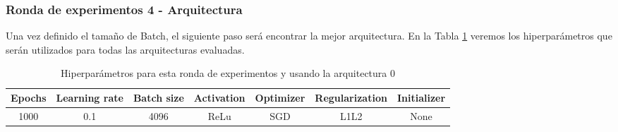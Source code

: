 \documentclass{article}
\begin{document}
      \subsubsection{Ronda de experimentos 4 - Arquitectura}
		\label{j-s-a0-e4} %
			Una vez definido el tama\~{n}o de Batch, el siguiente paso ser\'a encontrar la mejor arquitectura. En la Tabla \ref{tab:hip-j-a0-e4} veremos los hiperpar\'ametros que ser\'an utilizados para todas las arquitecturas evaluadas.
            
			\begin{table}[h!]
				\begin{center}
					\begin{tabular}{| c | c | c | c | c | c | c |}
						\textbf{Epochs} & \textbf{Learning rate} & \textbf{Batch size} & \textbf{Activation} & \textbf{Optimizer} & \textbf{Regularization} & \textbf{Initializer}\\ \hline
						1000 & 0.1 & 4096 & ReLu & SGD & L1L2 & None
					\end{tabular}
					\caption{Hiperpar\'ametros para esta ronda de experimentos y usando la arquitectura 0}
					\label{tab:hip-j-a0-e4}
				\end{center}
			\end{table}
			
\end{document}
